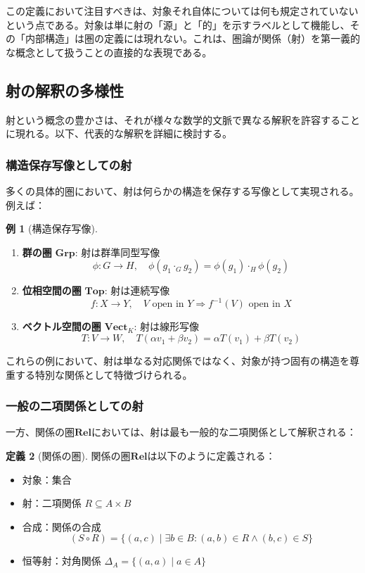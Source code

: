 \documentclass[11pt,a4paper,twocolumn]{ltjsarticle}
\theoremstyle{definition}
\newtheorem{definition}{定義}[section]
\newtheorem{example}[definition]{例}
\theoremstyle{plain}
\newcommand{\Grp}{\mathbf{Grp}}
\newcommand{\Top}{\mathbf{Top}}
\newcommand{\Rel}{\mathbf{Rel}}
\newcommand{\Vect}{\mathbf{Vect}}
\begin{document}
この定義において注目すべきは、対象それ自体については何も規定されていないという点である。対象は単に射の「源」と「的」を示すラベルとして機能し、その「内部構造」は圏の定義には現れない。これは、圏論が関係（射）を第一義的な概念として扱うことの直接的な表現である。

\subsection{射の解釈の多様性}

射という概念の豊かさは、それが様々な数学的文脈で異なる解釈を許容することに現れる。以下、代表的な解釈を詳細に検討する。

\subsubsection{構造保存写像としての射}

多くの具体的圏において、射は何らかの構造を保存する写像として実現される。例えば：

\begin{example}[構造保存写像]
\begin{enumerate}
\item \textbf{群の圏} $\Grp$: 射は群準同型写像
\[
\phi: G \to H, \quad \phi(g_1 \cdot_G g_2) = \phi(g_1) \cdot_H \phi(g_2)
\]

\item \textbf{位相空間の圏} $\Top$: 射は連続写像
\[
f: X \to Y, \quad V \text{ open in } Y \Rightarrow f^{-1}(V) \text{ open in } X
\]

\item \textbf{ベクトル空間の圏} $\Vect_K$: 射は線形写像
\[
T: V \to W, \quad T(\alpha v_1 + \beta v_2) = \alpha T(v_1) + \beta T(v_2)
\]
\end{enumerate}
\end{example}

これらの例において、射は単なる対応関係ではなく、対象が持つ固有の構造を尊重する特別な関係として特徴づけられる。

\subsubsection{一般の二項関係としての射}

一方、関係の圏$\Rel$においては、射は最も一般的な二項関係として解釈される：

\begin{definition}[関係の圏]
関係の圏$\Rel$は以下のように定義される：
\begin{itemize}
\item 対象：集合
\item 射：二項関係 $R \subseteq A \times B$
\item 合成：関係の合成
\[
(S \circ R) = \{(a, c) \mid \exists b \in B: (a, b) \in R \land (b, c) \in S\}
\]
\item 恒等射：対角関係 $\Delta_A = \{(a, a) \mid a \in A\}$
\end{itemize}
\end{definition}
\end{document}
